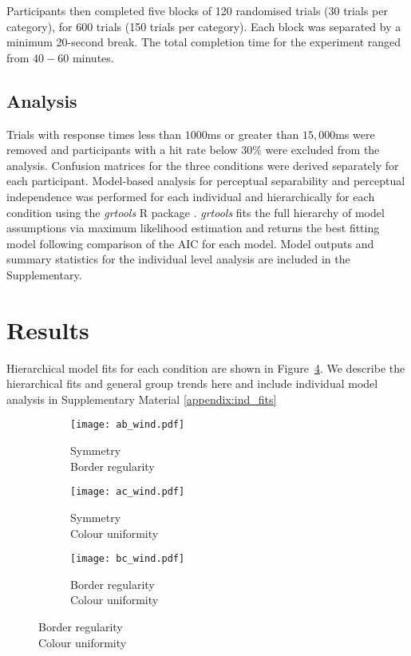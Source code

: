 \documentclass[man, 12pt, a4paper,  donotrepeattitle, floatsintext, draftfirst]{apa7}
\begin{document}
Participants then completed five blocks of 120 randomised trials (30 trials per category), for 600 trials (150 trials per category).
Each block was separated by a minimum 20-second break.
The total completion time for the experiment ranged from $40-60$ minutes.

\subsection{Analysis}
Trials with response times less than $1000$ms or greater than $15,000$ms were removed and participants with a hit rate below $30\%$ were excluded from the analysis.
Confusion matrices for the three conditions were derived separately for each participant.
Model-based analysis for perceptual separability and perceptual independence was performed for each individual and hierarchically for each condition using the \textit{grtools} R package \parencite{soto2017testing}.
\textit{grtools} fits the full hierarchy of model assumptions via maximum likelihood estimation and returns the best fitting model following comparison of the AIC for each model.
Model outputs and summary statistics for the individual level analysis are included in the Supplementary.

\section{Results}
Hierarchical model fits for each condition are shown in Figure~\ref{fig:grt_group}.
We describe the hierarchical fits and general group trends here and include individual model analysis in Supplementary Material \ref{appendix:ind_fits}

\begin{figure}[htb]
    \centering
    \caption{GRT Hierarchical Models}
    \begin{subfigure}[b]{0.3\textwidth}
        \texttt{[image: ab\_wind.pdf]}
        \caption{Symmetry\\Border regularity}
        \label{fig:grt_ab}
    \end{subfigure}
    \hfill
    \begin{subfigure}[b]{0.3\textwidth}
        \texttt{[image: ac\_wind.pdf]}
        \caption{Symmetry\\Colour uniformity}
        \label{fig:grt_ac}
    \end{subfigure}
    \hfill
    \begin{subfigure}[b]{0.3\textwidth}
        \texttt{[image: bc\_wind.pdf]}
        \caption{Border regularity\\Colour uniformity}
        \label{fig:grt_bc}
    \end{subfigure}
    \label{fig:grt_group}
\end{figure}
\end{document}
